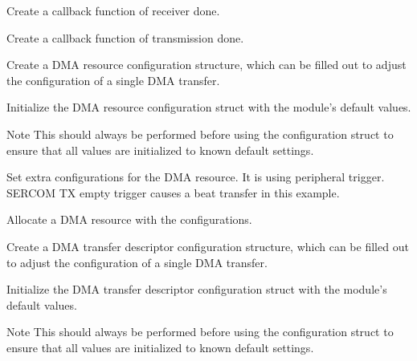\begin{DoxyEnumerate}
\item Create a callback function of receiver done. 
\begin{DoxyCodeInclude}
\end{DoxyCodeInclude}

\item Create a callback function of transmission done. 
\begin{DoxyCodeInclude}
\end{DoxyCodeInclude}

\item Create a D\+M\+A resource configuration structure, which can be filled out to adjust the configuration of a single D\+M\+A transfer. 
\begin{DoxyCodeInclude}
\end{DoxyCodeInclude}

\item Initialize the D\+M\+A resource configuration struct with the module's default values. 
\begin{DoxyCodeInclude}
\end{DoxyCodeInclude}
 \begin{DoxyNote}{Note}
This should always be performed before using the configuration struct to ensure that all values are initialized to known default settings.
\end{DoxyNote}

\item Set extra configurations for the D\+M\+A resource. It is using peripheral trigger. S\+E\+R\+C\+O\+M T\+X empty trigger causes a beat transfer in this example. 
\begin{DoxyCodeInclude}
\end{DoxyCodeInclude}

\item Allocate a D\+M\+A resource with the configurations. 
\begin{DoxyCodeInclude}
\end{DoxyCodeInclude}

\item Create a D\+M\+A transfer descriptor configuration structure, which can be filled out to adjust the configuration of a single D\+M\+A transfer. 
\begin{DoxyCodeInclude}
\end{DoxyCodeInclude}

\item Initialize the D\+M\+A transfer descriptor configuration struct with the module's default values. 
\begin{DoxyCodeInclude}
\end{DoxyCodeInclude}
 \begin{DoxyNote}{Note}
This should always be performed before using the configuration struct to ensure that all values are initialized to known default settings.
\end{DoxyNote}


\end{DoxyEnumerate}
